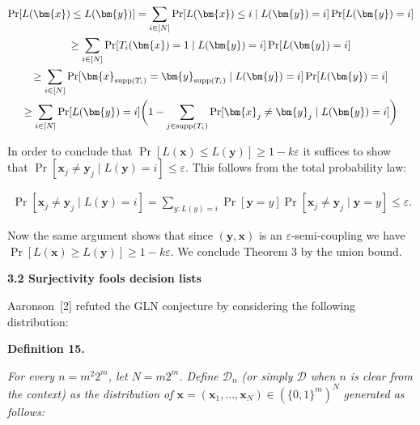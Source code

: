 \documentclass[10pt,a4paper]{article}
\begin{document}
\[\begin{gathered}
\displaystyle\Pr[L(\bm{x})\leq L(\bm{y})] \displaystyle=\sum_{i\in[N]}\Pr[L(\bm{x})\leq i\mid L(\bm{y})=i]\Pr[L(\bm{y})=i] \\
\displaystyle\geq\sum_{i\in[N]}\Pr[T_{i}(\bm{x})=1\mid L(\bm{y})=i]\Pr[L(\bm{y})=i] \\
\displaystyle\geq\sum_{i\in[N]}\Pr[\bm{x}_{\mathrm{supp}(T_{i})}=\bm{y}_{\mathrm{supp}(T_{i})}\mid L(\bm{y})=i]\Pr[L(\bm{y})=i] \\
\displaystyle\geq\sum_{i\in[N]}\Pr[L(\bm{y})=i]\bigg{(}1-\sum_{j\in\mathrm{supp}(T_{i})}\Pr[\bm{x}_{j}\neq\bm{y}_{j}\mid L(\bm{y})=i]\bigg{)}
\end{gathered}\]


In order to conclude that $\Pr[L(\bm{x})\leq L(\bm{y})]\geq 1-k\varepsilon$ it suffices to show that $\Pr[\bm{x}_{j}\neq\bm{y}_{j}\mid L(\bm{y})=i]\leq\varepsilon$. This follows from the total probability law:\par


\[\begin{gathered}
\Pr[\bm{x}_{j}\neq\bm{y}_{j}\mid L(\bm{y})=i]=\sum_{y\colon L(y)=i}\Pr[\bm{y}=y]\Pr[\bm{x}_{j}\neq\bm{y}_{j}\mid\bm{y}=y]\leq\varepsilon.
\end{gathered}\]


Now the same argument shows that since $(\bm{y},\bm{x})$ is an $\varepsilon$-semi-coupling we have $\Pr[L(\bm{x})\geq L(\bm{y})]\geq 1-k\varepsilon$. We conclude Theorem 3 by the union bound.\par





\par\medskip\noindent\textbf{
3.2 Surjectivity fools decision lists}\par




Aaronson [2] refuted the GLN conjecture by considering the following distribution:\par





\par\medskip\noindent\textbf{
\textbf{Definition 15}\textbf{.}
}\par



\emph{For every $n=m^{2}2^{m}$, let $N=m2^{m}$.
Define $\mathcal{D}_{n}$ (or simply $\mathcal{D}$ when $n$ is clear from the context) as the distribution of $\bm{x}=(\bm{x}_{1},\ldots,\bm{x}_{N})\in(\{0,1\}^{m})^{N}$ generated as follows:}\par
\end{document}
